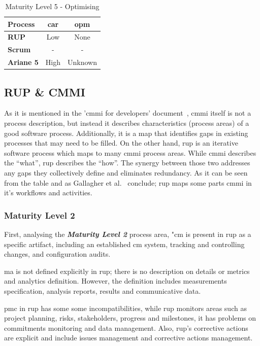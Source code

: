 \begin{table}[ht!]
    \centering
    \begin{tabular}{>{\bfseries}l|cc}
        Process & \acs{car} & \acs{opm} \\
        \toprule
        RUP     & Low & None \\
        Scrum   & - & - \\
        Ariane 5 & High & Unknown \\
    \end{tabular}
    \caption{Maturity Level 5 - Optimising}
    \label{tab:cmmi_l5}
\end{table}


\FloatBarrier

\subsection{RUP \& CMMI}

As it is mentioned in the '\ac{cmmi} for developers' document~\citep{team2010cmmi}, \ac{cmmi} itself is not a process description, but instead it describes characteristics (process areas) of a good software process. Additionally, it is a map that identifies gaps in existing processes that may need to be filled. 
On the other hand, \ac{rup} is an iterative software process which maps to many \ac{cmmi} process areas. 
While \ac{cmmi} describes the ``what'', \ac{rup} describes the ``how''. 
The synergy between those two addresses any gaps they collectively define and eliminates redundancy. 
As it can be seen from the table and as Gallagher et al.~\citep{gallagher2001rational} conclude; \ac{rup} maps some parts \ac{cmmi} in it's workflows and activities.

\subsubsection{Maturity Level 2}
First, analysing the \textbf{\textit{Maturity Level 2}} process area, "\ac{cm} is present in \ac{rup} as a specific artifact, including an established \ac{cm} system, tracking and controlling changes, and configuration audits.

\ac{ma} is not defined explicitly in \ac{rup}; there is no description on details or metrics and analytics definition. However, the definition includes measurements specification, analysis reports, results and communicative data.

\ac{pmc} in \ac{rup} has some some incompatibilities, while \ac{rup} monitors areas such as project planning, risks, stakeholders, progress and milestones, it has problems on commitments monitoring and data management. Also, \ac{rup}'s corrective actions are explicit and include issues management and corrective actions management.

